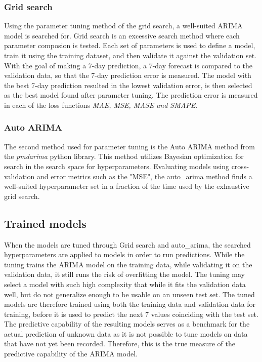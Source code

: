   \subsubsection*{Grid search}
  Using the parameter tuning method of the grid search, a well-suited ARIMA model is searched for.
  Grid search is an excessive search method where each parameter composion is tested.
  Each set of parameters is used to define a model, train it using the training dataset,
  and then validate it against the validation set.
  With the goal of making a 7-day prediction, a 7-day forecast is compared to the validation data,
  so that the 7-day prediction error is measured.
  The model with the best 7-day prediction resulted in the lowest validation error,
  is then selected as the best model found after parameter tuning.
  The prediction error is measured in each of the loss functions \textit{MAE, MSE, MASE and SMAPE}.

  \subsubsection{Auto ARIMA}
  The second method used for parameter tuning is the Auto ARIMA method from the \textit{pmdarima} python library.
  This method utilizes Bayesian optimization for search in the search space for hyperparameters.
  Evaluating models using cross-validation and error metrics such as the "MSE",
  the auto\_arima method finds a well-suited hyperparameter set in a fraction of the time used by the exhaustive grid search.

  \subsection{Trained models}
  When the models are tuned through Grid search and auto\_arima,
  the searched hyperparameters are applied to models in order to run predictions.
  While the tuning trains the ARIMA model on the training data, while validating it on the validation data,
  it still runs the risk of overfitting the model.
  The tuning may select a model with such high complexity that while it fits the validation data well,
  but do not generalize enough to be usable on an unseen test set.
  The tuned models are therefore trained using both the training data and validation data for training,
  before it is used to predict the next 7 values coinciding with the test set.
  The predictive capability of the resulting models serves as a benchmark for the actual prediction
  of unknown data as it is not possible to tune models on data that have not yet been recorded.
  Therefore, this is the true measure of the predictive capability of the ARIMA model.


